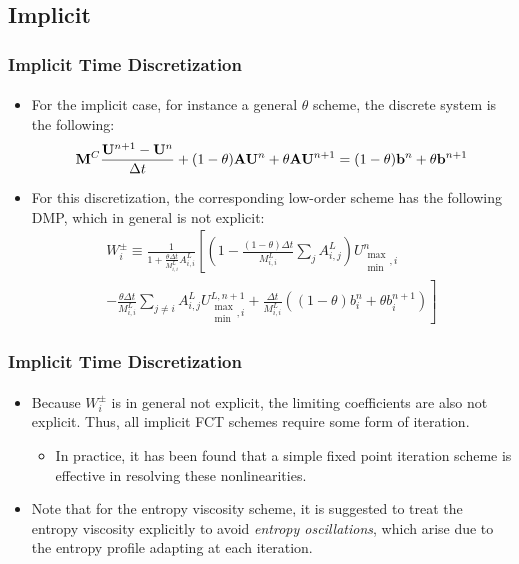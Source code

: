 \documentclass{beamer}
\begin{document}
\subsection{Implicit}
\begin{frame}
\frametitle{Implicit Time Discretization}
\framesubtitle{}

\begin{itemize}
   \item For the implicit case, for instance a general $\theta$ scheme, the
      discrete system is the following:
      \begin{equation}
        \consistentmassmatrix\frac{\solutionvector^{n+1}-\solutionvector^n}{\dt}
        + (1-\theta)\ssmatrix\solutionvector^n + \theta\ssmatrix\solutionvector^{n+1}
        = (1-\theta)\ssrhs^n + \theta\ssrhs^{n+1}
      \end{equation}
   \item For this discretization, the corresponding low-order scheme
      has the following DMP, which in general is not explicit:
      \begin{multline}
         W_i^\pm \equiv \frac{1}{1+\frac{\theta\Delta t}{M_{i,i}^L}A_{i,i}^L}
           \left[\left(1 - \frac{(1-\theta)
           \Delta t}{M_{i,i}^L}\sum\limits_j A_{i,j}^L\right)
           U_{\substack{\max\\\min},i}^n\right.\\\left.
          -\frac{\theta\Delta t}{M_{i,i}^L}\sum\limits_{j\ne i}A_{i,j}^L
           U_{\substack{\max\\\min},i}^{L,n+1}
          +\frac{\Delta t}{M_{i,i}^L}\left((1-\theta)b_i^n
          + \theta b_i^{n+1}\right)\right]
      \end{multline}
\end{itemize}

\end{frame}
\begin{frame}
\frametitle{Implicit Time Discretization}
\framesubtitle{}

\begin{itemize}
   \item Because $W_i^\pm$ is in general not explicit, the limiting coefficients
      are also not explicit. Thus, all implicit FCT schemes require some form
      of iteration.
      \begin{itemize}
         \item In practice, it has been found that a simple fixed point iteration
            scheme is effective in resolving these nonlinearities.
      \end{itemize}
   \item Note that for the entropy viscosity scheme, it is suggested to treat
      the entropy viscosity explicitly to avoid \emph{entropy oscillations},
      which arise due to the entropy profile adapting at each iteration.
\end{itemize}

\end{frame}
\end{document}
